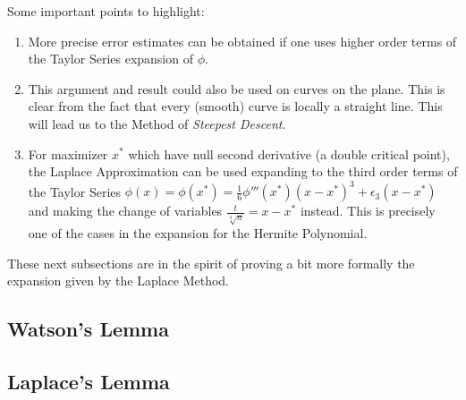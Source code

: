 Some important points to highlight:
\begin{enumerate}
	\item More precise error estimates can be obtained if one uses higher order terms of the Taylor Series expansion of $\phi$.
	\item This argument and result could also be used on curves on the plane. This is clear from the fact that every (smooth) curve is locally a straight line. This will lead us to the Method of \textit{Steepest Descent}.
	\item For maximizer $x^*$ which have null second derivative (a double critical point), the Laplace Approximation can be used expanding to the third order terms of the Taylor Series $\phi(x) = \phi(x^*) = \frac{1}{6}\phi'''(x^*)(x-x^*)^3 + \epsilon_3(x-x^*)$ and making the change of variables $\frac{t}{\sqrt[3]{n}} = x - x^*$ instead. This is precisely one of the cases in the expansion for the Hermite Polynomial. 
\end{enumerate}

These next subsections are in the spirit of proving a bit more formally the expansion given by the Laplace Method. 

\subsection{Watson's Lemma}


\subsection{Laplace's Lemma}
